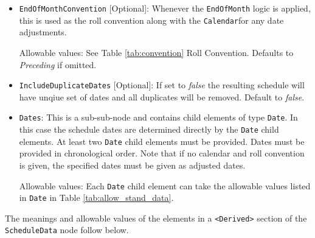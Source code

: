 \begin{itemize}
\item \lstinline!EndOfMonthConvention! [Optional]: Whenever the \lstinline!EndOfMonth! logic is applied, this is used as the roll convention along with the \lstinline!Calendar!for any date adjustments.

Allowable values: See Table \ref{tab:convention} Roll Convention. Defaults to \emph{Preceding} if omitted.

\item \lstinline!IncludeDuplicateDates! [Optional]: If set to \emph{false} the resulting schedule will have unqiue set of dates and all duplicates will be removed. Default to \emph{false}.

\item \lstinline!Dates!: This is a sub-sub-node and contains child elements of type
  \lstinline!Date!. In this case the schedule dates are determined
  directly by the \lstinline!Date! child elements.  At least two
  \lstinline!Date! child elements must be provided. Dates must be provided in chronological order. Note that if no calendar and roll convention is given, the specified dates must be given as adjusted dates.    

  Allowable values: Each \lstinline!Date!  child element can take the allowable values listed in \lstinline!Date! in
  Table \ref{tab:allow_stand_data}.

\end{itemize}

\medskip
The meanings and allowable values of the elements in a {\tt <Derived>} section of the \lstinline!ScheduleData! node follow below.

